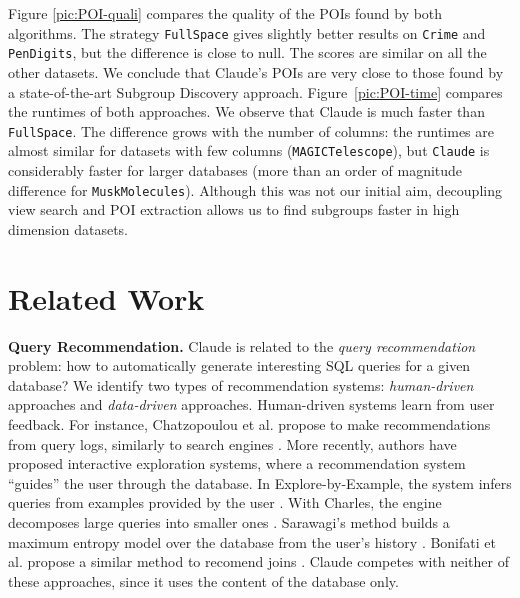 Figure \ref{pic:POI-quali} compares the quality of the POIs found by both
algorithms. The strategy \texttt{FullSpace} gives slightly better results on
\texttt{Crime} and \texttt{PenDigits}, but the difference is close to null. The
scores are similar on all the other datasets. We conclude that Claude's POIs
are very close to those found by a state-of-the-art Subgroup Discovery approach.
Figure~\ref{pic:POI-time} compares the runtimes of both approaches.  We observe
that Claude is much faster than \texttt{FullSpace}. The difference grows with
the number of columns: the runtimes are almost similar for datasets with few
columns (\texttt{MAGICTelescope}), but \texttt{Claude} is considerably faster
for larger databases (more than an order of magnitude difference for
\texttt{MuskMolecules}). Although this was not our initial aim, decoupling view
search and POI extraction allows us to find subgroups faster in high dimension
datasets.

\section{Related Work}
\label{sec:related}

\textbf{Query Recommendation.} Claude is related to the \emph{query
recommendation} problem: how to automatically generate interesting SQL queries
for a given database? We identify two types of recommendation systems:
\emph{human-driven} approaches and \emph{data-driven} approaches. Human-driven
systems learn from user feedback. For instance, Chatzopoulou et al. propose to
make recommendations from query logs, similarly to search engines
\cite{chatzopoulou2009query}. More recently, authors have proposed interactive
exploration systems, where a recommendation system ``guides'' the user through
the database. In Explore-by-Example, the system infers queries from examples
provided by the user \cite{dimitriadou2014explore}. With Charles, the engine
decomposes large queries into smaller ones \cite{sellam2013meet}. Sarawagi's
method builds a maximum entropy model over the database from the user's history
\cite{sarawagi2000user}. Bonifati et al. propose a similar method to recomend
joins \cite{bonifati2014interactive}.  Claude competes with neither of these
approaches, since it uses the content of the database only.

